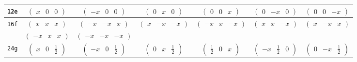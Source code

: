 \documentclass[fleqn,9pt,landscape]{jsarticle}
\begin{document}
\begin{center}
\begin{longtable}{ccccccc}
{\tt 12e} & $ \begin{pmatrix} x & 0 & 0 \end{pmatrix} $ & $ \begin{pmatrix} - x & 0 & 0 \end{pmatrix} $ & $ \begin{pmatrix} 0 & x & 0 \end{pmatrix} $ & $ \begin{pmatrix} 0 & 0 & x \end{pmatrix} $ & $ \begin{pmatrix} 0 & - x & 0 \end{pmatrix} $ & $ \begin{pmatrix} 0 & 0 & - x \end{pmatrix} $ \\ \hline
{\tt 16f} & $ \begin{pmatrix} x & x & x \end{pmatrix} $ & $ \begin{pmatrix} - x & - x & x \end{pmatrix} $ & $ \begin{pmatrix} x & - x & - x \end{pmatrix} $ & $ \begin{pmatrix} - x & x & - x \end{pmatrix} $ & $ \begin{pmatrix} x & x & - x \end{pmatrix} $ & $ \begin{pmatrix} x & - x & x \end{pmatrix} $ \\
& $ \begin{pmatrix} - x & x & x \end{pmatrix} $ & $ \begin{pmatrix} - x & - x & - x \end{pmatrix} $ & $  $ & $  $ & $  $ & $  $ \\ \hline
{\tt 24g} & $ \begin{pmatrix} x & 0 & \frac{1}{2} \end{pmatrix} $ & $ \begin{pmatrix} - x & 0 & \frac{1}{2} \end{pmatrix} $ & $ \begin{pmatrix} 0 & x & \frac{1}{2} \end{pmatrix} $ & $ \begin{pmatrix} \frac{1}{2} & 0 & x \end{pmatrix} $ & $ \begin{pmatrix} - x & \frac{1}{2} & 0 \end{pmatrix} $ & $ \begin{pmatrix} 0 & - x & \frac{1}{2} \end{pmatrix} $ \\

\end{longtable}
\end{center}
\end{document}
